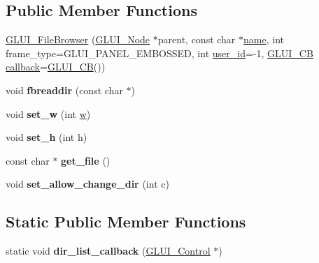 \subsection*{Public Member Functions}
\begin{DoxyCompactItemize}
\item 
\hyperlink{classGLUI__FileBrowser_ace9c0db8913e7e5ecc72a859746e0d45}{G\-L\-U\-I\-\_\-\-File\-Browser} (\hyperlink{classGLUI__Node}{G\-L\-U\-I\-\_\-\-Node} $\ast$parent, const char $\ast$\hyperlink{classGLUI__Control_aa95b97d50df45335fc33f0af03958eb3}{name}, int frame\-\_\-type=G\-L\-U\-I\-\_\-\-P\-A\-N\-E\-L\-\_\-\-E\-M\-B\-O\-S\-S\-E\-D, int \hyperlink{classGLUI__Control_a6c88b7c72b0800f88a5d4cda4868c8b6}{user\-\_\-id}=-\/1, \hyperlink{classGLUI__CB}{G\-L\-U\-I\-\_\-\-C\-B} \hyperlink{classGLUI__Control_a96060fe0cc6d537e736dd6eef78e24ab}{callback}=\hyperlink{classGLUI__CB}{G\-L\-U\-I\-\_\-\-C\-B}())
\item 
\hypertarget{classGLUI__FileBrowser_a76b3f6caf8832c0972d8b38c0f77e535}{void {\bfseries fbreaddir} (const char $\ast$)}\label{classGLUI__FileBrowser_a76b3f6caf8832c0972d8b38c0f77e535}

\item 
\hypertarget{classGLUI__FileBrowser_a03e1e54808847b5e7461d27826cf7827}{void {\bfseries set\-\_\-w} (int \hyperlink{classGLUI__Control_aca82a099b9cbbadb188794cbfb06aa27}{w})}\label{classGLUI__FileBrowser_a03e1e54808847b5e7461d27826cf7827}

\item 
\hypertarget{classGLUI__FileBrowser_a41b68f6bf7e87c25236a6a7ae78ee98b}{void {\bfseries set\-\_\-h} (int h)}\label{classGLUI__FileBrowser_a41b68f6bf7e87c25236a6a7ae78ee98b}

\item 
\hypertarget{classGLUI__FileBrowser_a671f6f7608f38f48d07f7739e1efcad3}{const char $\ast$ {\bfseries get\-\_\-file} ()}\label{classGLUI__FileBrowser_a671f6f7608f38f48d07f7739e1efcad3}

\item 
\hypertarget{classGLUI__FileBrowser_a5395fc694e33fab6cd3a0546b6899292}{void {\bfseries set\-\_\-allow\-\_\-change\-\_\-dir} (int c)}\label{classGLUI__FileBrowser_a5395fc694e33fab6cd3a0546b6899292}

\end{DoxyCompactItemize}
\subsection*{Static Public Member Functions}
\begin{DoxyCompactItemize}
\item 
\hypertarget{classGLUI__FileBrowser_ae473d5085830f69178e4f4ff3db3f2b7}{static void {\bfseries dir\-\_\-list\-\_\-callback} (\hyperlink{classGLUI__Control}{G\-L\-U\-I\-\_\-\-Control} $\ast$)}\label{classGLUI__FileBrowser_ae473d5085830f69178e4f4ff3db3f2b7}

\end{DoxyCompactItemize}
